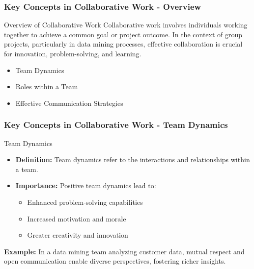 \documentclass[aspectratio=169]{beamer}
\begin{document}
\begin{frame}[fragile]
  \frametitle{Key Concepts in Collaborative Work - Overview}
  \begin{block}{Overview of Collaborative Work}
    Collaborative work involves individuals working together to achieve a common goal or project outcome. In the context of group projects, particularly in data mining processes, effective collaboration is crucial for innovation, problem-solving, and learning.
  \end{block}
  
  \begin{itemize}
    \item Team Dynamics
    \item Roles within a Team
    \item Effective Communication Strategies
  \end{itemize}
\end{frame}

\begin{frame}[fragile]
  \frametitle{Key Concepts in Collaborative Work - Team Dynamics}
  \begin{block}{Team Dynamics}
    \begin{itemize}
      \item \textbf{Definition:} Team dynamics refer to the interactions and relationships within a team.
      \item \textbf{Importance:} Positive team dynamics lead to:
      \begin{itemize}
        \item Enhanced problem-solving capabilities
        \item Increased motivation and morale
        \item Greater creativity and innovation
      \end{itemize}
    \end{itemize}
    
    \textbf{Example:} In a data mining team analyzing customer data, mutual respect and open communication enable diverse perspectives, fostering richer insights.
  \end{block}
\end{frame}
\end{document}

